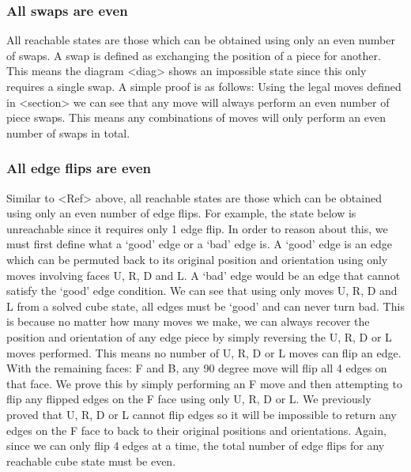 \documentclass[titlepage]{report}[12pt]
\begin{document}
\subsubsection{All swaps are even}
All reachable states are those which can be obtained using only an even number of swaps. A swap is defined as exchanging the position of a piece for another. This means the diagram <diag> shows an impossible state since this only requires a single swap. A simple proof is as follows: Using the legal moves defined in <section> we can see that any move will always perform an even number of piece swaps. This means any combinations of moves will only perform an even number of swaps in total.

\subsubsection{All edge flips are even}
Similar to <Ref> above, all reachable states are those which can be obtained using only an even number of edge flips. For example, the state below is unreachable since it requires only 1 edge flip. In order to reason about this, we must first define what a `good' edge or a `bad' edge is. A `good' edge is an edge which can be permuted back to its original position and orientation using only moves involving faces U, R, D and L. A `bad' edge would be an edge that cannot satisfy the `good' edge condition. We can see that using only moves U, R, D and L from a solved cube state, all edges must be `good' and can never turn bad. This is because no matter how many moves we make, we can always recover the position and orientation of any edge piece by simply reversing the U, R, D or L moves performed. This means no number of U, R, D or L moves can flip an edge. 
\\
\indent With the remaining faces: F and B, any 90 degree move will flip all 4 edges on that face. We prove this by simply performing an F move and then attempting to flip any flipped edges on the F face using only U, R, D or L. We previously proved that U, R, D or L cannot flip edges so it will be impossible to return any edges on the F face to back to their original positions and orientations. Again, since we can only flip 4 edges at a time, the total number of edge flips for any reachable cube state must be even.
\end{document}
